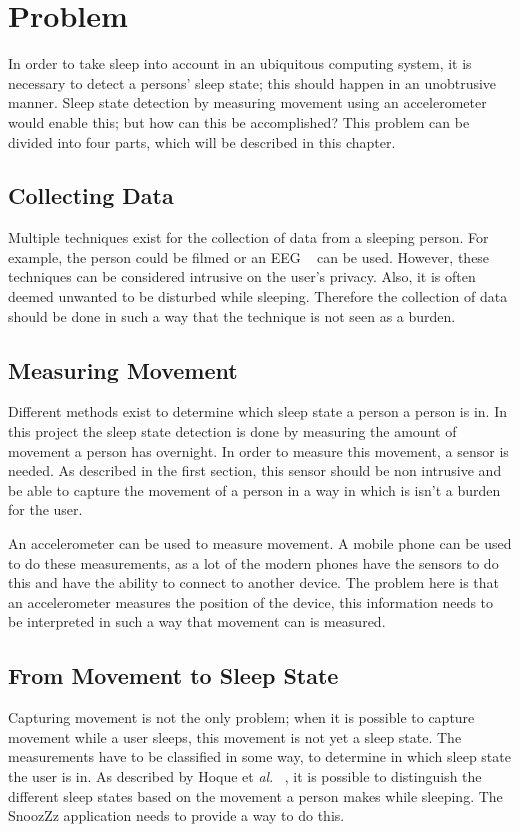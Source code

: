 \chapter{Problem} %
\label{cha:problem}
In order to take sleep into account in an ubiquitous computing system, it is necessary to detect a persons' sleep state; this should happen in an unobtrusive manner. Sleep state detection by measuring movement using an accelerometer would enable this; but how can this be accomplished? This problem can be divided into four parts, which will be described in this chapter.

\section{Collecting Data} %
\label{sec:collecting_data}
Multiple techniques exist for the collection of data from a sleeping person. For example, the person could be filmed or an EEG ~\cite{Itil196976} can be used. However, these techniques can be considered intrusive on the user's privacy. Also, it is often deemed unwanted to be disturbed while sleeping. Therefore the collection of data should be done in such a way that the technique is not seen as a burden.

\section{Measuring Movement} %
\label{sec:measuring_movement}
Different methods exist to determine which sleep state a person a person is in. In this project the sleep state detection is done by measuring the amount of movement a person has overnight. In order to measure this movement, a sensor is needed. As described in the first section, this sensor should be non intrusive and be able to capture the movement of a person in a way in which is isn't a burden for the user. 

An accelerometer can be used to measure movement. A mobile phone can be used to do these measurements, as a lot of the modern phones have the sensors to do this and have the ability to connect to another device. The problem here is that an accelerometer measures the position of the device, this information needs to be interpreted in such a way that movement can is measured.

\section{From Movement to Sleep State} %
\label{sec:from_movement_to_sleep_states}
Capturing movement is not the only problem; when it is possible to capture movement while a user sleeps, this movement is not yet a sleep state. The measurements have to be classified in some way, to determine in which sleep state the user is in. As described by Hoque et \emph{al}. ~\cite{Hoque:2010:MBP:1921081.1921088}, it is possible to distinguish the different sleep states based on the movement a person makes while sleeping. The SnoozZz application needs to provide a way to do this.

